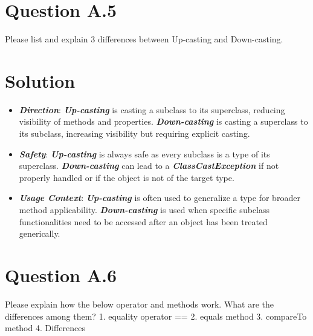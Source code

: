 \documentclass[12pt]{article}
\begin{document}
\section*{Question A.5}
Please list and explain 3 differences between Up-casting and Down-casting.

\section*{Solution}
\begin{itemize}
  \item \textbf{\textit{Direction}}: \textbf{\textit{Up-casting}} is casting a subclass to its superclass, reducing visibility of methods and properties. \textbf{\textit{Down-casting}} is casting a superclass to its subclass, increasing visibility but requiring explicit casting.
  \item \textbf{\textit{Safety}}: \textbf{\textit{Up-casting}} is always safe as every subclass is a type of its superclass. \textbf{\textit{Down-casting}} can lead to a \textbf{\textit{ClassCastException}} if not properly handled or if the object is not of the target type.
  \item \textbf{\textit{Usage Context}}: \textbf{\textit{Up-casting}} is often used to generalize a type for broader method applicability. \textbf{\textit{Down-casting}} is used when specific subclass functionalities need to be accessed after an object has been treated generically.
\end{itemize}

\section*{Question A.6}
Please explain how the below operator and methods work. What are the differences among them?
1. equality operator ==
2. equals method
3. compareTo method
4. Differences
\end{document}
